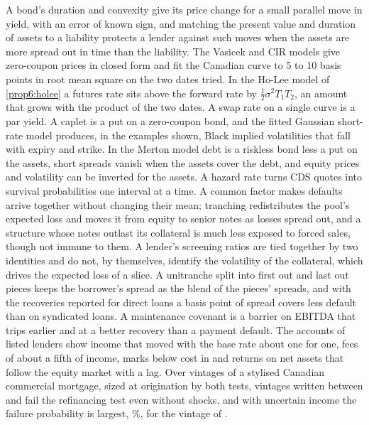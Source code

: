 \begin{chapterrefs}
A bond's duration and convexity give its price change for a small parallel move in yield, with an
error of known sign, and matching the present value and duration of assets to a liability protects a
lender against such moves when the assets are more spread out in time than the liability. The Vasicek
and CIR models give zero-coupon prices in closed form and fit the Canadian curve to 5 to 10 basis
points in root mean square on the two dates tried. In the Ho-Lee model of \cref{prop6:holee} a futures
rate sits above the forward rate by $\tfrac12\sigma^2T_1T_2$, an amount that grows with the product of
the two dates. A swap rate on a single curve is a par yield. A caplet is a put on a zero-coupon bond, and
the fitted Gaussian short-rate model produces, in the examples shown, Black implied volatilities that fall with expiry and strike. In the Merton model
debt is a riskless bond less a put on the assets, short spreads vanish when the assets cover the
debt, and equity prices and volatility can be inverted for the assets. A hazard rate turns CDS quotes
into survival probabilities one interval at a time. A common factor makes defaults arrive together
without changing their mean; tranching redistributes the pool's expected loss and moves it from
equity to senior notes as losses spread out, and a structure whose notes outlast its collateral is much less exposed to forced sales, though not
immune to them. A lender's screening ratios are tied together by two identities and do not, by themselves,
identify the volatility of the collateral, which drives the expected loss of a slice. A unitranche
split into first out and last out pieces keeps the borrower's spread as the blend of the pieces'
spreads, and with the recoveries reported for direct loans a basis point of spread covers less default
than on syndicated loans. A maintenance covenant is a barrier on EBITDA that trips earlier and at a
better recovery than a payment default. The accounts of \dlFirms{} listed lenders show income that moved
with the base rate about one for one, fees of about a fifth of income, marks below cost in \dlLast{} and
returns on net assets that follow the equity market with a lag. Over \csN{} vintages
of a stylised Canadian commercial mortgage, sized at origination by both tests, \csFails{} vintages written
between \csFailFirst{} and \csFailLast{} fail the refinancing test even without shocks, and with uncertain
income the failure probability is largest, \csPdMax\%, for the vintage of \csPdMaxDate.


\end{chapterrefs}
